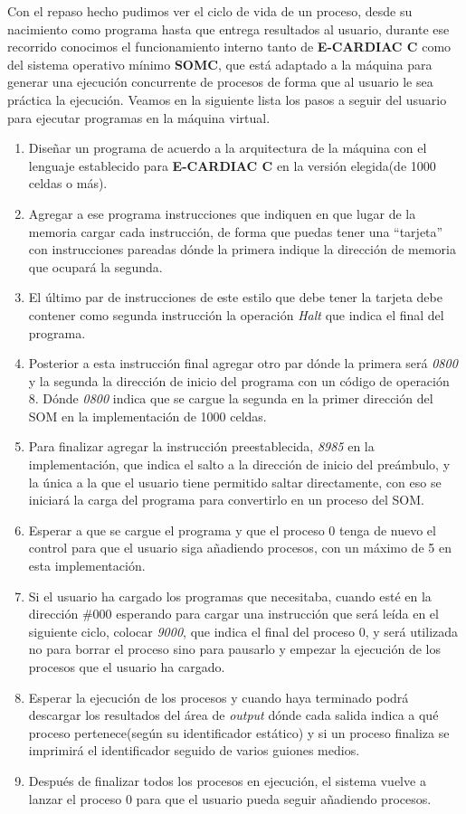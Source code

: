\documentclass[letterpaper,12pt,oneside]{book}
\begin{document}
			Con el repaso hecho pudimos ver el ciclo de vida de un proceso, desde su nacimiento como programa hasta que entrega resultados al usuario,
			durante ese recorrido conocimos el funcionamiento interno tanto de \textbf{E-CARDIAC C} como del sistema operativo mínimo \textbf{SOMC}, que
			está adaptado a la máquina para generar una ejecución concurrente de procesos de forma que al usuario le sea práctica la ejecución. Veamos
			en la siguiente lista los pasos a seguir del usuario para ejecutar programas en la máquina virtual.
			
			\begin{enumerate}

				\item Diseñar un programa de acuerdo a la arquitectura de la máquina con el lenguaje establecido para \textbf{E-CARDIAC C} en
				la versión elegida(de 1000 celdas o más).
				\item Agregar a ese programa instrucciones que indiquen en que lugar de la memoria cargar cada instrucción, de forma que puedas tener
				una ``tarjeta'' con instrucciones pareadas dónde la primera indique la dirección de memoria que ocupará la segunda.
				\item El último par de instrucciones de este estilo que debe tener la tarjeta debe contener como segunda instrucción
				la operación \textit{Halt} que indica el final del programa.
				\item Posterior a esta instrucción final agregar otro par dónde la primera será \textit{0800} y la segunda la dirección de inicio del
				programa con un código de operación 8. Dónde \textit{0800} indica que se cargue la segunda en la primer dirección del SOM en
				la implementación de 1000 celdas.
				\item Para finalizar agregar la instrucción preestablecida, \textit{8985} en la implementación, que indica el salto a la dirección de 
				inicio del preámbulo, y
				la única a la que el usuario tiene permitido saltar directamente, con eso se iniciará la carga del programa para convertirlo en
				un proceso del SOM.
				\item Esperar a que se cargue el programa y que el proceso 0 tenga de nuevo el control para que el usuario siga añadiendo procesos, con 
				un
				máximo de 5 en esta implementación.
				\item Si el usuario ha cargado los programas que necesitaba, cuando esté en la dirección \#000 esperando para cargar una instrucción
				que será leída en el siguiente ciclo, colocar \textit{9000}, que indica el final del proceso 0, y será utilizada no para borrar el 
				proceso
				sino para pausarlo y empezar la ejecución de los procesos que el usuario ha cargado.
				\item Esperar la ejecución de los procesos y cuando haya terminado podrá descargar los resultados del área de \textit{output} dónde
				cada salida indica a qué proceso pertenece(según su identificador estático) y si un proceso finaliza se imprimirá el identificador
				seguido de varios guiones medios.
				\item Después de finalizar todos los procesos en ejecución, el sistema vuelve a lanzar el proceso 0 para que el usuario pueda
				seguir añadiendo procesos.
				

\end{enumerate}
\end{document}
